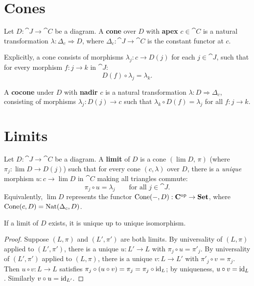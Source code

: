 \section{Cones}

\begin{definition}[Cone]
Let $D: \cat{J} \to \cat{C}$ be a diagram. A \textbf{cone} over $D$ with \textbf{apex} $c \in \cat{C}$ is a natural transformation $\lambda: \Delta_c \Rightarrow D$, where $\Delta_c: \cat{J} \to \cat{C}$ is the constant functor at $c$.

Explicitly, a cone consists of morphisms $\lambda_j: c \to D(j)$ for each $j \in \cat{J}$, such that for every morphism $f: j \to k$ in $\cat{J}$:
\[
  D(f) \circ \lambda_j = \lambda_k.
\]
\end{definition}

\begin{definition}[Cocone]
A \textbf{cocone} under $D$ with \textbf{nadir} $c$ is a natural transformation $\lambda: D \Rightarrow \Delta_c$, consisting of morphisms $\lambda_j: D(j) \to c$ such that $\lambda_k \circ D(f) = \lambda_j$ for all $f: j \to k$.
\end{definition}

\section{Limits}

\begin{definition}[Limit]
Let $D: \cat{J} \to \cat{C}$ be a diagram. A \textbf{limit} of $D$ is a cone $(\lim D,\, \pi)$ (where $\pi_j: \lim D \to D(j)$) such that for every cone $(c, \lambda)$ over $D$, there is a \emph{unique} morphism $u: c \to \lim D$ in $\cat{C}$ making all triangles commute:
\[
  \pi_j \circ u = \lambda_j \qquad \text{for all } j \in \cat{J}.
\]
Equivalently, $\lim D$ represents the functor $\mathrm{Cone}(-, D): \mathbf{C}^{\mathrm{op}} \to \mathbf{Set}$, where $\mathrm{Cone}(c,D) = \operatorname{Nat}(\Delta_c, D)$.
\end{definition}

\begin{proposition}
If a limit of $D$ exists, it is unique up to unique isomorphism.
\end{proposition}

\begin{proof}
Suppose $(L, \pi)$ and $(L', \pi')$ are both limits. By universality of $(L, \pi)$ applied to $(L', \pi')$, there is a unique $u: L' \to L$ with $\pi_j \circ u = \pi'_j$. By universality of $(L', \pi')$ applied to $(L, \pi)$, there is a unique $v: L \to L'$ with $\pi'_j \circ v = \pi_j$. Then $u \circ v: L \to L$ satisfies $\pi_j \circ (u \circ v) = \pi_j = \pi_j \circ \mathrm{id}_L$; by uniqueness, $u \circ v = \mathrm{id}_L$. Similarly $v \circ u = \mathrm{id}_{L'}$.
\end{proof}

